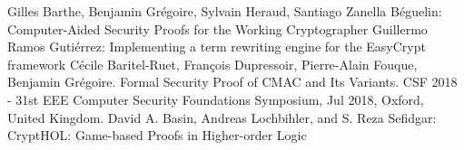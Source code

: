 \documentclass[runningheads,a4paper]{llncs}
\begin{document}
\begin{thebibliography}{4}
Gilles Barthe, Benjamin Grégoire, Sylvain Heraud, Santiago Zanella Béguelin: Computer-Aided Security Proofs
for the Working Cryptographer
Guillermo Ramos Gutiérrez: Implementing a term rewriting
engine for the EasyCrypt framework
Cécile Baritel-Ruet, François Dupressoir, Pierre-Alain Fouque, Benjamin Grégoire. Formal Security
Proof of CMAC and Its Variants. CSF 2018 - 31st EEE Computer Security Foundations Symposium,
Jul 2018, Oxford, United Kingdom.
David A. Basin, Andreas Lochbihler, and S. Reza Sefidgar: CryptHOL: Game-based Proofs in
Higher-order Logic

\end{thebibliography}
\end{document}

